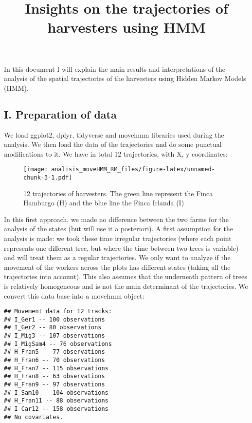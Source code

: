 \documentclass[
]{article}
\title{Insights on the trajectories of harvesters using HMM}
\author{}
\date{\vspace{-2.5em}}
\begin{document}
\maketitle

In this document I will explain the main results and interpretations of
the analysis of the spatial trajectories of the harvesters using Hidden
Markov Models (HMM).

\hypertarget{i.-preparation-of-data}{%
\subsection{I. Preparation of data}\label{i.-preparation-of-data}}

We load ggplot2, dplyr, tidyverse and movehmm libraries used during the
analysis. We then load the data of the trajectories and do some punctual
modifications to it. We have in total 12 trajectories, with X, y
coordinates:

\begin{figure}
\centering
\texttt{[image: analisis\_moveHMM\_RM\_files/figure-latex/unnamed-chunk-3-1.pdf]}
\caption{12 trajectories of harvesters. The green line represent the
Finca Hamburgo (H) and the blue line the Finca Irlanda (I)}
\end{figure}

In this first approach, we made no difference between the two farms for
the analysis of the states (but will use it a posteriori). A first
assumption for the analysis is made: we took these time irregular
trajectories (where each point represents one different tree, but where
the time between two trees is variable) and will treat them as a regular
trajectories. We only want to analyze if the movement of the workers
across the plots has different states (taking all the trajectories into
account). This also assumes that the underneath pattern of trees is
relatively homogeneous and is not the main determinant of the
trajectories. We convert this data base into a movehmm object:

\begin{verbatim}
## Movement data for 12 tracks:
## I_Ger1 -- 100 observations
## I_Ger2 -- 80 observations
## I_Mig3 -- 107 observations
## I_MigSam4 -- 76 observations
## H_Fran5 -- 77 observations
## H_Fran6 -- 70 observations
## H_Fran7 -- 115 observations
## H_Fran8 -- 63 observations
## H_Fran9 -- 97 observations
## I_Sam10 -- 104 observations
## H_Fran11 -- 88 observations
## I_Car12 -- 158 observations
## No covariates.
\end{verbatim}
\end{document}
